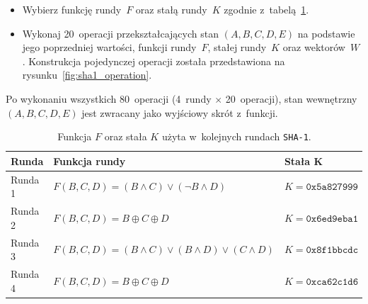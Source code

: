 \documentclass[12pt,a4paper,twoside]{article}
\begin{document}
\begin{myenumerate}
\begin{myenumerate}
\begin{itemize}
\begin{itemize}
                \item Wybierz funkcję rundy~$F$ oraz stałą rundy~$K$ zgodnie
                z~tabelą~\ref{tbl:sha1_round_function}.

                \item Wykonaj 20~operacji przekształcających stan $(A,B,C,D,E)$
                na podstawie jego poprzedniej wartości, funkcji rundy~$F$,
                stałej rundy~$K$ oraz wektorów~$W$. Konstrukcja pojedynczej
                operacji została przedstawiona na
                rysunku~\ref{fig:sha1_operation}.

            \end{itemize}

        \end{itemize}

    \end{myenumerate}

    \item Po wykonaniu wszystkich 80~operacji (4~rundy $\times$ 20~operacji),
    stan wewnętrzny $(A,B,C,D,E)$ jest zwracany jako wyjściowy skrót z~funkcji.

\end{myenumerate}

\begin{table}[H]
    \caption{Funkcja $F$ oraz stała $K$ użyta w~kolejnych rundach
    \texttt{SHA-1}.}
    \label{tbl:sha1_round_function}
    \begin{tabular}{|l|l|l|}
        \hline
        Runda & Funkcja rundy & Stała K \\
        \hline
        Runda 1 &
        $F(B,C,D) = (B \land C) \lor (\lnot B \land D)$ &
        $K = \mathtt{0x5a827999}$ \\

        Runda 2 &
        $F(B,C,D) = B \oplus C \oplus D$ &
        $K = \mathtt{0x6ed9eba1}$ \\

        Runda 3 &
        $F(B,C,D) = (B \land C) \lor (B \land D) \lor (C \land D)$ &
        $K = \mathtt{0x8f1bbcdc}$ \\

        Runda 4 &
        $F(B,C,D) = B \oplus C \oplus D$ &
        $K = \mathtt{0xca62c1d6}$ \\
        \hline
    \end{tabular}
\end{table}
\end{document}
